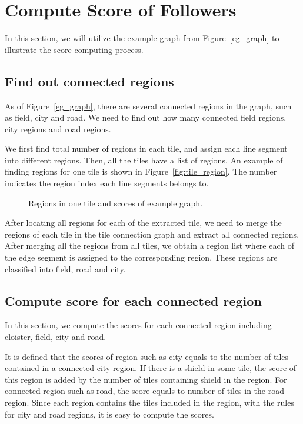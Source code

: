 \section{Compute Score of Followers}
\label{sec:score}
In this section, we will utilize the example graph from Figure~\ref{eg_graph} to illustrate the score computing process.

\subsection{Find out connected regions}
As of Figure~\ref{eg_graph}, there are several connected regions in the graph, such as field, city and road. We need to find out how many 
connected field regions, city regions and road regions. 

We first find total number of regions in each tile, and assign each line segment into different regions. Then, all the tiles have a list 
of regions. An example of finding regions for one tile is shown in Figure~\ref{fig:tile_region}. The number indicates the region index each 
line segments belongs to.

\begin{figure}[htbp]
	  \centering
	  \caption{Regions in one tile and scores of example graph.}
\end{figure}

After locating all regions for each of the extracted tile, we need to merge the regions of each tile in the tile connection graph and extract 
all connected regions. After merging all the regions from all tiles, we obtain a region list where each of the edge segment is assigned to 
the corresponding region. These regions are classified into field, road and city.

\subsection{Compute score for each connected region}
In this section, we compute the scores for each connected region including cloister, field, city and road. 

It is defined that the scores of region such as city equals to the number of tiles 
contained in a connected city region. If there is a shield in some tile, the score of this region is added by the number of tiles containing 
shield in the region. For connected region such as road, the score equals to number of tiles in the road region. Since each region contains the tiles included in the region, with the rules for city and road regions, it is easy to compute the scores.

